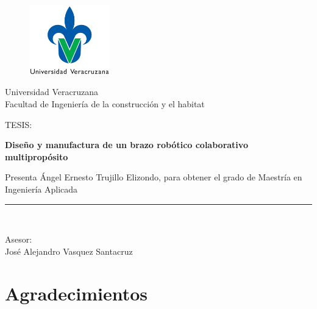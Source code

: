 \begin{titlepage}

\begin{center}
\vspace*{-1in}
\begin{figure}[htb]
\begin{center}
\includegraphics[width=3.5cm]{./img/chapter0/logouv.jpg}
\end{center}
\end{figure}
\begin{Large}
Universidad Veracruzana
\\
\vspace*{0.15in}
Facultad de Ingeniería de la construcción y el habitat \\
\vspace*{0.6in}
\end{Large}
\begin{large}
TESIS:\\
\end{large}
\vspace*{0.2in}
\begin{Large}
\textbf{Diseño y manufactura de un brazo robótico colaborativo multipropósito} \\
\end{Large}
\vspace*{0.3in}
\begin{large}
Presenta Ángel Ernesto Trujillo Elizondo, para obtener el grado de Maestría en Ingeniería Aplicada\\
\end{large}
\vspace*{0.3in}
\rule{80mm}{0.1mm}\\
\vspace*{0.1in}
\begin{large}
Asesor: \\
José Alejandro Vasquez Santacruz \\
\end{large}
\end{center}
\end{titlepage}


\tableofcontents
\listoffigures
\listoftables

\chapter*{Agradecimientos} 

